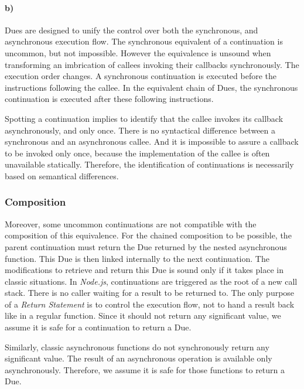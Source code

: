 \paragraph{b)}
Dues are designed to unify the control over both the synchronous, and asynchronous execution flow.
The synchronous equivalent of a continuation is uncommon, but not impossible.
However the equivalence is unsound when transforming an imbrication of callees invoking their callbacks synchronously.
The execution order changes.
A synchronous continuation is executed before the instructions following the callee.
In the equivalent chain of Dues, the synchronous continuation is executed after these following instructions.

Spotting a continuation implies to identify that the callee invokes its callback asynchronously, and only once.
There is no syntactical difference between a synchronous and an asynchronous callee.
And it is impossible to assure a callback to be invoked only once, because the implementation of the callee is often unavailable statically.
Therefore, the identification of continuations is necessarily based on semantical differences.

\subsubsection{Composition}

Moreover, some uncommon continuations are not compatible with the composition of this equivalence.
For the chained composition to be possible, the parent continuation must return the Due returned by the nested asynchronous function.
This Due is then linked internally to the next continuation.
The modifications to retrieve and return this Due is sound only if it takes place in classic situations.
In \textit{Node.js}, continuations are triggered as the root of a new call stack.
There is no caller waiting for a result to be returned to.
The only purpose of a \textit{Return Statement} is to control the execution flow, not to hand a result back like in a regular function.
Since it should not return any significant value, we assume it is safe for a continuation to return a Due.

Similarly, classic asynchronous functions do not synchronously return any significant value.
The result of an asynchronous operation is available only asynchronously.
Therefore, we assume it is safe for those functions to return a Due.

